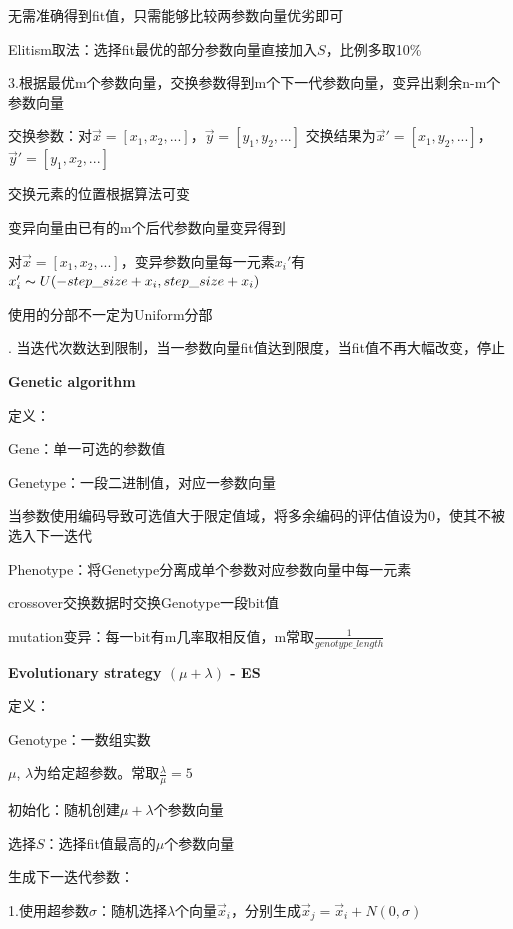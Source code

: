 \documentclass[UTF8]{ctexart}
\begin{document}
  \quad \quad \quad 无需准确得到fit值，只需能够比较两参数向量优劣即可

  \quad \quad Elitism取法：选择fit最优的部分参数向量直接加入$S$，比例多取10\%

  \quad \quad \quad 

  \quad 3.根据最优m个参数向量，交换参数得到m个下一代参数向量，变异出剩余n-m个参数向量

  \quad \quad 交换参数：对$\vec{x} = [x_1, x_2, ...]$，$\vec{y} = [y_1, y_2, ...]$ 交换结果为$\vec{x}' = [x_1, y_2, ...]$，$\vec{y}' = [y_1, x_2, ...]$

  \quad \quad \quad 交换元素的位置根据算法可变

  \quad \quad 变异向量由已有的m个后代参数向量变异得到

  \quad \quad \quad 对$\vec{x} = [x_1, x_2, ...]$，变异参数向量每一元素$x_i'$有$x_i' \thicksim U(-step\_size + x_i, step\_size + x_i)$

  \quad \quad \quad 使用的分部不一定为Uniform分部

  . 当迭代次数达到限制，当一参数向量fit值达到限度，当fit值不再大幅改变，停止

  \textbf{Genetic algorithm}
  
  \quad 定义：

  \quad \quad Gene：单一可选的参数值
  
  \quad \quad Genetype：一段二进制值，对应一参数向量
  
  \quad \quad \quad 当参数使用编码导致可选值大于限定值域，将多余编码的评估值设为0，使其不被选入下一迭代

  \quad \quad Phenotype：将Genetype分离成单个参数对应参数向量中每一元素

  \quad crossover交换数据时交换Genotype一段bit值

  \quad mutation变异：每一bit有m几率取相反值，m常取$\frac{1}{genotype\_length}$

  \textbf{Evolutionary strategy $(\mu + \lambda)$ - ES}

  \quad 定义： 

  \quad \quad Genotype：一数组实数

  \quad \quad $\mu$, $\lambda$为给定超参数。常取$\frac{\lambda}{\mu} = 5$

  \quad 初始化：随机创建$\mu + \lambda$个参数向量

  \quad 选择$S$：选择fit值最高的$\mu$个参数向量

  \quad 生成下一迭代参数：
  
  \quad \quad 1.使用超参数$\sigma$：随机选择$\lambda$个向量$\vec{x}_i$，分别生成$\vec{x}_j = \vec{x}_i + N(0, \sigma)$
\end{document}
